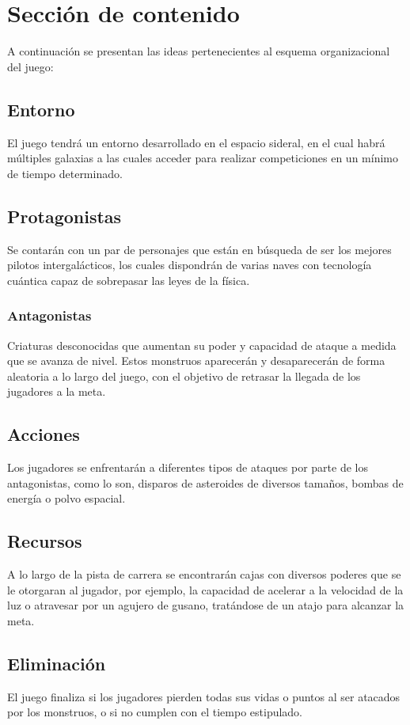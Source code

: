 \documentclass{article}
\begin{document}
\section{Sección de contenido} \label{contenido}
A continuación se presentan las ideas pertenecientes al esquema organizacional del juego:

\subsection{Entorno}
El juego tendrá un entorno desarrollado en el espacio sideral, en el cual habrá múltiples galaxias a las cuales acceder para realizar competiciones en un mínimo de tiempo determinado.
\subsection{Protagonistas}
Se contarán con un par de personajes que están en búsqueda de ser los mejores pilotos intergalácticos, los cuales dispondrán de varias naves con tecnología cuántica capaz de sobrepasar las leyes de la física.

\subsubsection{Antagonistas}
Criaturas desconocidas que aumentan su poder y capacidad de ataque a medida que se avanza de nivel. Estos monstruos aparecerán y desaparecerán de forma aleatoria a lo largo del juego, con el objetivo de retrasar la llegada de los jugadores a la meta.

\subsection{Acciones}
Los jugadores se enfrentarán a diferentes tipos de ataques por parte de los antagonistas, como lo son, disparos de asteroides de diversos tamaños, bombas de energía o polvo espacial.

\subsection{Recursos}
A lo largo de la pista de carrera se encontrarán cajas con diversos poderes que se le otorgaran al jugador, por ejemplo, la capacidad de acelerar a la velocidad de la luz o atravesar por un agujero de gusano, tratándose de un atajo para alcanzar la meta.

\subsection{Eliminación}
El juego finaliza si los jugadores pierden todas sus vidas o puntos al ser atacados por los monstruos, o si no cumplen con el tiempo estipulado.
\end{document}
